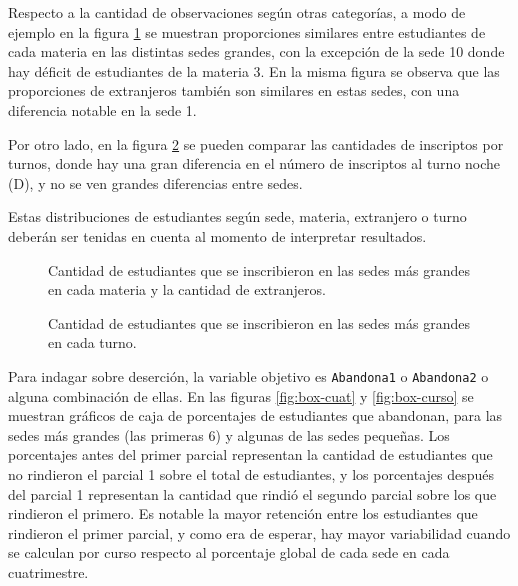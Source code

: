 \documentclass[a4paper,11pt,dvipsnames]{article}
\begin{document}
Respecto a la cantidad de observaciones según otras categorías, a modo de ejemplo en la figura \ref{fig:nalum} se muestran proporciones similares entre estudiantes de cada materia en las distintas sedes grandes, con la excepción de la sede 10 donde hay déficit de estudiantes de la materia 3. En la misma figura se observa que las proporciones de extranjeros también son similares en estas sedes, con una diferencia notable en la sede 1.\par\medskip

Por otro lado, en la figura \ref{fig:turnos} se pueden comparar las cantidades de inscriptos por turnos, donde hay una gran diferencia en el número de inscriptos al turno noche (D), y no se ven grandes diferencias entre sedes.\par\medskip

Estas distribuciones de estudiantes según sede, materia, extranjero o turno deberán ser tenidas en cuenta al momento de interpretar resultados.

\begin{figure}[!t]
    \begin{center}
        
    \end{center}
    \caption{Cantidad de estudiantes que se inscribieron en las sedes más grandes en cada materia y la cantidad de extranjeros.}
    \label{fig:nalum}
\end{figure}


\begin{figure}[!h]
    \begin{center}
        
    \end{center}
    \caption{Cantidad de estudiantes que se inscribieron en las sedes más grandes en cada turno.}
    \label{fig:turnos}
\end{figure}

Para indagar sobre deserción, la variable objetivo es \texttt{Abandona1} o \texttt{Abandona2} o alguna combinación de ellas. En las figuras \ref{fig:box-cuat} y \ref{fig:box-curso} se muestran gráficos de caja de porcentajes de estudiantes que abandonan, para las sedes más grandes (las primeras 6) y algunas de las sedes pequeñas. Los porcentajes antes del primer parcial representan la cantidad de estudiantes que no rindieron el parcial 1 sobre el total de estudiantes, y los porcentajes después del parcial 1 representan la cantidad que rindió el segundo parcial sobre los que rindieron el primero. Es notable la mayor retención entre los estudiantes que rindieron el primer parcial, y como era de esperar, hay mayor variabilidad cuando se calculan por curso respecto al porcentaje global de cada sede en cada cuatrimestre.
\end{document}
